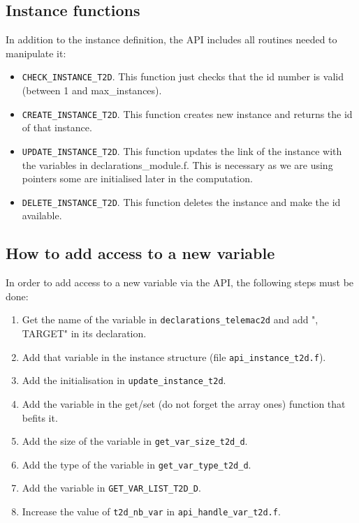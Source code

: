\subsection{Instance functions}

In addition to the instance definition, the API includes all routines needed to
manipulate it:

\begin{itemize}
\item \verb!CHECK_INSTANCE_T2D!. This function just checks that the id number
  is valid (between 1 and max\_instances).
\item \verb!CREATE_INSTANCE_T2D!. This function creates new instance and
  returns the id of that instance.
\item \verb!UPDATE_INSTANCE_T2D!. This function updates the link of the
  instance with the variables in declarations\_module.f. This is necessary as we
    are using pointers some are initialised later in the computation.
\item \verb!DELETE_INSTANCE_T2D!. This function deletes the instance and make
  the id available.
\end{itemize}
%
\subsection{How to add access to a new variable}
\label{var_add}
%
In order to add access to a new variable via the API, the following steps must
be done:

\begin{enumerate}
\item Get the name of the variable in \verb!declarations_telemac2d! and add ",
  TARGET" in its declaration.
\item Add that variable in the instance structure (file
  \verb!api_instance_t2d.f!).
\item Add the initialisation in \verb!update_instance_t2d!.
\item Add the variable in the get/set (do not forget the array ones) function that befits it.
\item Add the size of the variable in \verb!get_var_size_t2d_d!.
\item Add the type of the variable in \verb!get_var_type_t2d_d!.
\item Add the variable in \verb!GET_VAR_LIST_T2D_D!.
\item Increase the value of \verb!t2d_nb_var! in \verb!api_handle_var_t2d.f!.
\end{enumerate}

